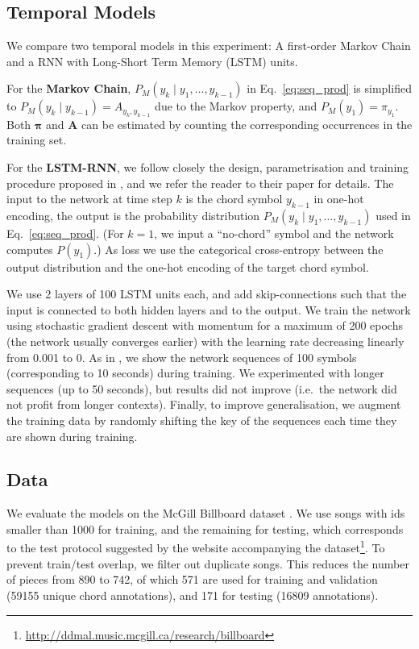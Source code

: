 \documentclass[twocolumn]{article}
\begin{document}
\subsection{Temporal Models}

We compare two temporal models in this experiment: A first-order Markov Chain
and a RNN with Long-Short Term Memory (LSTM) units. 

For the \textbf{Markov Chain}, $P_M(y_k \mid y_1, \ldots, y_{k-1})$ in
Eq.~\ref{eq:seq_prod} is simplified to $P_M(y_k \mid y_{k-1}) =
A_{y_k,y_{k-1}}$ due to the Markov property, and $P_M(y_1) =
\pi_{y_1}$. Both $\bm{\pi}$ and $\bm{A}$ can be estimated by
counting the corresponding occurrences in the training set.

For the \textbf{LSTM-RNN}, we follow closely the design, parametrisation and
training procedure proposed in \cite{sigtia_audio_2015}, and we refer the
reader to their paper for details. The input to the network at time step $k$ is
the chord symbol $y_{k-1}$ in one-hot encoding, the output is the probability
distribution $P_M(y_k \mid y_1, \ldots, y_{k-1})$ used in
Eq.~\ref{eq:seq_prod}. (For $k=1$, we input a ``no-chord'' symbol and the
network computes $P(y_1)$.) As loss we use the categorical cross-entropy
between the output distribution and the one-hot encoding of the target chord
symbol.

We use 2 layers of 100 LSTM units each, and add skip-connections such that
the input is connected to both hidden layers and to the output. We train the
network using stochastic gradient descent with momentum for a maximum of 200
epochs (the network usually converges earlier) with the learning rate
decreasing linearly from 0.001 to 0.  As in \cite{sigtia_audio_2015}, we show
the network sequences of 100 symbols (corresponding to 10 seconds) during
training. We experimented with longer sequences (up to 50 seconds), but results
did not improve (i.e.\, the network did not profit from longer contexts).
Finally, to improve generalisation, we augment the training data by randomly
shifting the key of the sequences each time they are shown during training.

\subsection{Data}

We evaluate the models on the McGill Billboard dataset
\cite{burgoyne_expert_2011}. We use songs with ids smaller than 1000 for
training, and the remaining for testing, which corresponds to the test protocol
suggested by the website accompanying the
dataset\footnote{\url{http://ddmal.music.mcgill.ca/research/billboard}}.  To
prevent train/test overlap, we filter out duplicate songs. This reduces the
number of pieces from 890 to 742, of which 571 are used for training and
validation (59155 unique chord annotations), and 171 for testing
(16809 annotations). 
\end{document}
